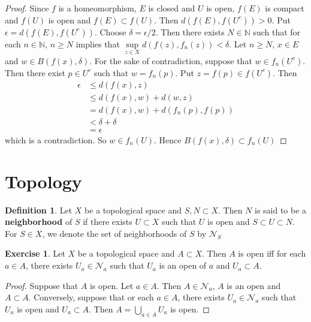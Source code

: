\documentclass[12pt]{amsart}
\theoremstyle{definition}
\newtheorem{defn}[definition]{Definition}
\newtheorem{ex}[definition]{Exercise}
\newcommand{\del}{\delta}
\newcommand{\ep}{\epsilon}
\newcommand{\N}{\mathbb{N}}
\newcommand{\MN}{\mathcal{N}}
\begin{document}
	\begin{proof}
	Since $f$ is a homeomorphism, $E$ is closed and $U$ is open, $f(E)$ is compact and $f(U)$ is open and $f(E) \subset f(U)$. Then $d(f(E), f(U^c)) >0$. Put $\ep = d(f(E), f(U^c))$. Choose $\del = \ep/2$. Then there exists $N \in \N$ such that for each $n \in \N$, $n \geq N$ implies that $\sup\limits_{z \in X} d(f(z), f_n(z)) < \del$. Let $n \geq N$, $x \in E$ and $w \in B(f(x), \del)$. For the sake of contradiction, suppose that $w \in f_n(U^c)$. Then there exist $p \in U^c$ such that $w = f_n(p)$. Put $z = f(p) \in f(U^c)$. Then 
	\begin{align*}
	\ep 
	&\leq d(f(x), z) \\ 
	&\leq d(f(x), w) + d(w, z) \\
	& = d(f(x), w) + d(f_n(p), f(p))  \\
	& < \del + \del \\
	& = \ep
	\end{align*}
	which is a contradiction. So $w \in f_n(U)$. Hence $B(f(x), \del) \subset f_n(U)$
	\end{proof}
	
	
	
	
	
	
	
	
	
	
	
	
	\newpage
	\section{Topology}
	
	\begin{defn}
	Let $X$ be a topological space and $S,N \subset X$. Then $N$ is said to be a \textbf{neighborhood} of $S$ if there exists $U \subset X$ such that $U$ is open and $S \subset U \subset N$. For $S \in X$, we denote the set of neighborhoods of $S$ by $\MN_S$ 
	\end{defn}
	
	\begin{ex}
	Let $X$ be a topological space and $A \subset X$. Then $A$ is open iff for each $a \in A$, there exists $U_a \in \MN_a$ such that $U_a$ is an open of $a$ and $U_a \subset A$.
	\end{ex}
	
	\begin{proof}
	Suppose that $A$ is open. Let $a \in A$. Then $A \in \MN_a$, $A$ is an open and $A \subset A$. Conversely, suppose that or each $a \in A$, there exists $U_a \in \MN_a$ such that $U_a$ is open and $U_a \subset A$. Then $A = \bigcup\limits_{a \in A}U_a$ is open. 
	\end{proof}
	
\end{document}

